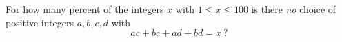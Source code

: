 For how many percent of the integers $x$ with $1\le x\le100$ is there \emph{no} choice of positive integers $a,b,c,d$ with
\[
ac+bc+ad+bd=x\ ?
\]
